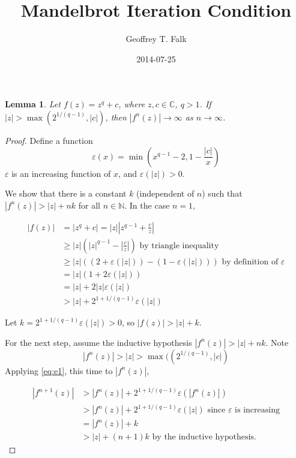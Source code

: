 \documentclass[11pt]{article}
\date{2014-07-25}
\author{Geoffrey T. Falk}
\title{Mandelbrot Iteration Condition}
\begin{document}

\maketitle

\newtheorem*{lemma}{Lemma}

\begin{lemma}
Let $f(z) = z^q + c$, where $z, c \in \mathbb C$, $q > 1$.
If $|z| > \max(2^{1/(q-1)}, |c|)$, then
$|f^n(z)| \rightarrow \infty$ as $n \rightarrow \infty$.
\end{lemma}

\begin{proof}
Define a function $$\varepsilon(x) = \min\left(x^{q-1} - 2, 1 - \frac{|c|}{x}\right)$$
$\varepsilon$ is an increasing function of $x$, and $\varepsilon(|z|) > 0$.

We show that there is a constant $k$ (independent of $n$) such that 
$|f^n(z)| > |z| + n k$ for all $n \in \mathbb N$. In the case $n = 1$,

\begin{equation} \label{eq:e1}
\begin{aligned}
|f(z)| &= \left| z^q + c \right| = |z| \left| z^{q-1} + \frac{c}{z} \right| \\
&\geq |z| \left( |z|^{q-1} - {\left|\frac{c}{z}\right|}\right) \text{ by triangle inequality} \\
&\geq |z| \left( \left(2 + \varepsilon(|z|) \right) - \left(1 - \varepsilon(|z|)\right)\right)
 \text{ by definition of $\varepsilon$} \\
&= |z| \left(1 + 2 \varepsilon(|z|) \right) \\
&= |z| + 2 |z| \varepsilon(|z|) \\
&> |z| + 2^{1 + {1/(q-1)}} \varepsilon(|z|)
\end{aligned}
\end{equation}

Let $k = 2^{1 + {1/(q-1)}} \varepsilon(|z|) > 0$, so $|f(z)| > |z| + k$.

For the next step, assume the inductive hypothesis $|f^n(z)| > |z| + n k$.
Note $$|f^n(z)| > |z| > \max((2^{1/(q-1)}, |c|)$$
Applying \eqref{eq:e1}, this time to $|f^n(z)|$,

\begin{equation} \label{eq:e2}
\begin{aligned}
\left|f^{n+1}(z)\right| 
&> \left|f^n(z)\right| +  2^{1 + {1/(q-1)}} \varepsilon(\left|f^n(z)\right|) \\
&> \left|f^n(z)\right| + 2^{1 + {1/(q-1)}} \varepsilon(|z|) \text{ since $\varepsilon$ is increasing} \\
&= \left|f^n(z)\right| + k \\
&> |z| + (n+1)k \text{ by the inductive hypothesis.}
\end{aligned}
\end{equation}
\end{proof}
\end{document}
